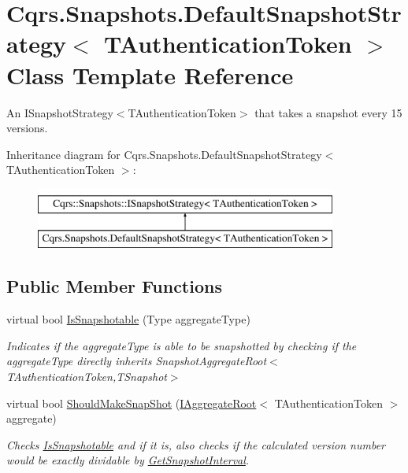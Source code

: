 \hypertarget{classCqrs_1_1Snapshots_1_1DefaultSnapshotStrategy}{}\section{Cqrs.\+Snapshots.\+Default\+Snapshot\+Strategy$<$ T\+Authentication\+Token $>$ Class Template Reference}
\label{classCqrs_1_1Snapshots_1_1DefaultSnapshotStrategy}


An I\+Snapshot\+Strategy$<$\+T\+Authentication\+Token$>$ that takes a snapshot every 15 versions.  


Inheritance diagram for Cqrs.\+Snapshots.\+Default\+Snapshot\+Strategy$<$ T\+Authentication\+Token $>$\+:\begin{figure}[H]
\begin{center}
\leavevmode
\includegraphics[height=2.000000cm]{classCqrs_1_1Snapshots_1_1DefaultSnapshotStrategy}
\end{center}
\end{figure}
\subsection*{Public Member Functions}
\begin{DoxyCompactItemize}
\item 
virtual bool \hyperlink{classCqrs_1_1Snapshots_1_1DefaultSnapshotStrategy_acdbb918ac01b526aedb5fa9a3879887a_acdbb918ac01b526aedb5fa9a3879887a}{Is\+Snapshotable} (Type aggregate\+Type)
\begin{DoxyCompactList}\small\item\em Indicates if the {\itshape aggregate\+Type}  is able to be snapshotted by checking if the {\itshape aggregate\+Type}  directly inherits Snapshot\+Aggregate\+Root$<$\+T\+Authentication\+Token,\+T\+Snapshot$>$ \end{DoxyCompactList}\item 
virtual bool \hyperlink{classCqrs_1_1Snapshots_1_1DefaultSnapshotStrategy_a211413236ef217c73a69e8d7fe4e555e_a211413236ef217c73a69e8d7fe4e555e}{Should\+Make\+Snap\+Shot} (\hyperlink{interfaceCqrs_1_1Domain_1_1IAggregateRoot}{I\+Aggregate\+Root}$<$ T\+Authentication\+Token $>$ aggregate)
\begin{DoxyCompactList}\small\item\em Checks \hyperlink{classCqrs_1_1Snapshots_1_1DefaultSnapshotStrategy_acdbb918ac01b526aedb5fa9a3879887a_acdbb918ac01b526aedb5fa9a3879887a}{Is\+Snapshotable} and if it is, also checks if the calculated version number would be exactly dividable by \hyperlink{classCqrs_1_1Snapshots_1_1DefaultSnapshotStrategy_a3540a6d621d8c23816da761f929d83a7_a3540a6d621d8c23816da761f929d83a7}{Get\+Snapshot\+Interval}. \end{DoxyCompactList}\end{DoxyCompactItemize}

